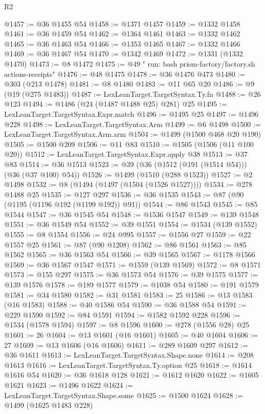 \begin{lexlean}{R2}
\begin{coremodule}
@1457 := @36 @1455 @54
@1458 := @1371 @1457
@1459 := @1332 @1458
@1461 := @36 @1459 @54
@1462 := @1364 @1461
@1463 := @1332 @1462
@1465 := @36 @1463 @54
@1466 := @1353 @1465
@1467 := @1332 @1466
@1469 := @36 @1467 @54
@1470 := @1342 @1469
@1472 := @1331 (@1332 @1470)
@1473 := @8 @1472
@1475 := @49 "        run: bash prism-factory/factory.sh actions-receipts"
@1476 := @48 @1475
@1478 := @36 @1476 @473
@1480 := @303 (@213 @1478)
@1481 := @8 @1480
@1483 := @11 @65 @20
@1486 := @9 (@19 (@275 @1483))
@1487 := LexLeanTarget.TargetSyntax.Ty.fn
@1488 := @26 @123
@1494 := @1486 (@24 (@1487 @1488 @25) @281) @25
@1495 := LexLeanTarget.TargetSyntax.Expr.match
@1496 := @1495 @25
@1497 := @1496 @228
@1498 := LexLeanTarget.TargetSyntax.Arm
@1499 := @6 @1498
@1500 := LexLeanTarget.TargetSyntax.Arm.arm
@1504 := @1499 (@1500 @468 @20 @190)
@1505 := @1500 @209
@1506 := @11 @83
@1510 := @1505 (@1506 (@11 @100 @20))
@1512 := LexLeanTarget.TargetSyntax.Expr.apply @38
@1513 := @37 @83
@1514 := @36 @1513
@1523 := @39 (@36 (@1512 (@191 (@1514 @54))) (@36 (@37 @100) @54))
@1526 := @1499 (@1510 (@288 @1523))
@1527 := @2 @1498
@1532 := @8 (@1494 (@1497 (@1504 (@1526 @1527))))
@1534 := @278 @1488 @25
@1535 := @127 @297
@1536 := @36 @1535
@1543 := @87 (@90 (@1195 (@1196 @192 (@1199 @192)) @91))
@1544 := @86 @1543
@1545 := @85 @1544
@1547 := @36 @1545 @54
@1548 := @1536 @1547
@1549 := @139 @1548
@1551 := @36 @1549 @54
@1552 := @39 @1551
@1554 := @1534 (@139 @1552)
@1555 := @8 @1554
@1556 := @24 @995
@1557 := @1556 @27
@1559 := @22 @1557 @25
@1561 := @87 (@90 @1208)
@1562 := @86 @1561
@1563 := @85 @1562
@1565 := @36 @1563 @54
@1566 := @39 @1565
@1567 := @1178 @1566
@1569 := @36 @1567 @1547
@1571 := @1559 (@139 @1569)
@1572 := @8 @1571
@1573 := @155 @297
@1575 := @36 @1573 @54
@1576 := @39 @1575
@1577 := @139 @1576
@1578 := @189 @1577
@1579 := @1038 @54
@1580 := @191 @1579
@1581 := @34 @1580
@1582 := @31 @1581
@1583 := 25
@1586 := @13 @1583 (@16 @1583)
@1588 := @40 @1586 @54
@1590 := @36 @1588 @54
@1591 := @229 @1590
@1592 := @84 @1591
@1594 := @1582 @1592 @228
@1596 := @1534 (@1578 @1594)
@1597 := @8 @1596
@1600 := @278 (@1556 @28) @25
@1601 := 26
@1604 := @13 @1601 (@16 @1601)
@1605 := @40 @1604
@1606 := 27
@1609 := @13 @1606 (@16 @1606)
@1611 := @289 @1609 @297
@1612 := @36 @1611
@1613 := LexLeanTarget.TargetSyntax.Shape.none
@1614 := @208 @1613
@1616 := LexLeanTarget.TargetSyntax.Ty.option @25
@1618 := @1614 @1616 @54
@1620 := @36 @1618 @128
@1621 := @1612 @1620
@1622 := @1605 @1621
@1623 := @1496 @1622
@1624 := LexLeanTarget.TargetSyntax.Shape.some
@1625 := @1500 @1624
@1628 := @1499 (@1625 @1483 @228)

\end{coremodule}
\end{lexlean}
